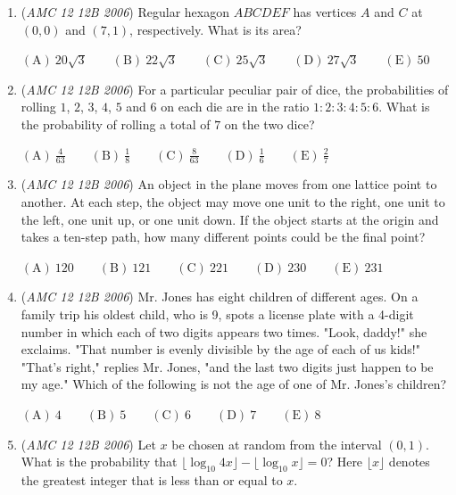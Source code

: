 \begin{enumerate}
	\item (\textit{AMC 12 12B 2006}) Regular hexagon $ABCDEF$ has vertices $A$ and $C$ at $(0,0)$ and $(7,1)$, respectively. What is its area?


 $\mathrm{(A)}\ 20\sqrt {3} \qquad \mathrm{(B)}\ 22\sqrt {3} \qquad \mathrm{(C)}\ 25\sqrt {3} \qquad \mathrm{(D)}\ 27\sqrt {3} \qquad \mathrm{(E)}\ 50$


	\item (\textit{AMC 12 12B 2006}) For a particular peculiar pair of dice, the probabilities of rolling $1$, $2$, $3$, $4$, $5$ and $6$ on each die are in the ratio $1:2:3:4:5:6$. What is the probability of rolling a total of $7$ on the two dice?


 $\mathrm{(A)}\ \frac 4{63} \qquad \mathrm{(B)}\ \frac 18  \qquad \mathrm{(C)}\ \frac 8{63} \qquad \mathrm{(D)}\ \frac 16 \qquad \mathrm{(E)}\ \frac 27$


	\item (\textit{AMC 12 12B 2006}) An object in the plane moves from one lattice point to another. At each step, the object may move one unit to the right, one unit to the left, one unit up, or one unit down. If the object starts at the origin and takes a ten-step path, how many different points could be the final point?


 $\mathrm{(A)}\ 120 \qquad \mathrm{(B)}\ 121 \qquad \mathrm{(C)}\ 221 \qquad \mathrm{(D)}\ 230 \qquad \mathrm{(E)}\ 231$


	\item (\textit{AMC 12 12B 2006}) Mr. Jones has eight children of different ages. On a family trip his oldest child, who is 9, spots a license plate with a 4-digit number in which each of two digits appears two times. "Look, daddy!" she exclaims. "That number is evenly divisible by the age of each of us kids!" "That's right," replies Mr. Jones, "and the last two digits just happen to be my age." Which of the following is not the age of one of Mr. Jones's children?


 $\mathrm{(A)}\ 4 \qquad \mathrm{(B)}\ 5 \qquad \mathrm{(C)}\ 6 \qquad \mathrm{(D)}\ 7 \qquad \mathrm{(E)}\ 8$


	\item (\textit{AMC 12 12B 2006}) Let $x$ be chosen at random from the interval $(0,1)$. What is the probability that
$\lfloor\log_{10}4x\rfloor - \lfloor\log_{10}x\rfloor = 0$?
Here $\lfloor x\rfloor$ denotes the greatest integer that is less than or equal to $x$.


 


\end{enumerate}
